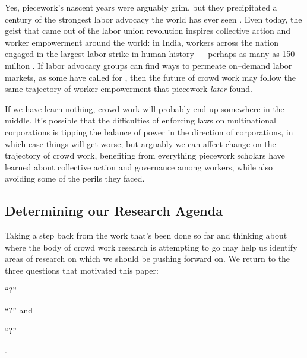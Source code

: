 \documentclass[trackingWork]{subfiles}
\begin{document}
Yes, piecework's nascent years were arguably grim, but
they precipitated a century of the strongest labor advocacy the world has ever seen
\cite{hart2013rise,mccallum2013global}.
Even today, the geist that came out of the labor union revolution
inspires collective action and worker empowerment around the world:
in India, workers across the nation engaged in
the largest labor strike in human history
--- perhaps as many as 150 million
\cite{indiaStrikeRealNews}.
If labor advocacy groups can find ways to permeate on--demand labor markets,
as some have called for
\cite{futureUnions},
then the future of crowd work may follow
the same trajectory of worker empowerment that piecework \textit{later} found.

If we have learn nothing, crowd work will probably end up somewhere in the middle.
It's possible that the difficulties of enforcing laws on multinational corporations is
tipping the balance of power in the direction of corporations, in which case
things will get worse;
but arguably we can affect change on the trajectory of crowd work,
benefiting from everything piecework scholars have learned about
collective action and governance
among workers, while also avoiding some of the perils they faced.



\subsection{Determining our Research Agenda}\label{sec:whatShouldBeTheFuture}
Taking a step back from the work that's been done so far and
thinking about where the body of crowd work research is attempting to go may help us identify
areas of research on which we should be pushing forward on.
We return to the three questions that motivated this paper:
\begin{inlinelist}
  \item ``?''
  \item ``?''
        and
  \item ``?''
\end{inlinelist}.
\end{document}
